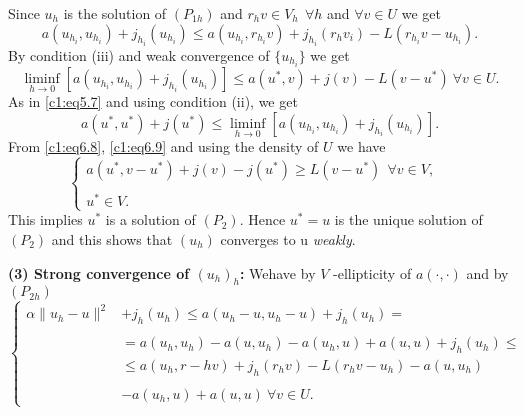 Since $u_h$ is the solution of $(P_{1h})$ and $r_h v \in V_h ~~
\forall h$ and $\forall v \in U$ we get  
\begin{equation}
a(u_{h_{i}}, u_{h_{i}})+j_{h_{i}} (u_{h_{i}}) \leq a(u_{h_{i}},
r_{h_{i}} v) + j_{h_{i}}(r_h v_i) -L(r_{h_{i}} v-u_{h_{i}}). 
\tag{6.7}\label{c1:eq6.7} 
\end{equation}
By condition (iii) and weak convergence of $\{u_{h_{i}}\}$ we get  
\begin{equation}
\mathop{\lim\inf}_{h \to 0}
[a(u_{h_{i}},u_{h_{i}})+j_{h_{i}}(u_{h_{i}})] \leq a(u^*, v)
+j(v)-L(v-u^*) ~ \forall v \in U. \tag{6.8}\label{c1:eq6.8}  
\end{equation}
As in \eqref{c1:eq5.7} and using condition (ii), we get
\begin{equation}
a(u^*, u^*) +j(u^*) \leq \mathop{\lim\inf}_{h \to 0}
[a(u_{h_{i}},u_{h_{i}})+j_{h_{i}}(u_{h_{i}})]. \tag{6.9}\label{c1:eq6.9} 
\end{equation}
From \eqref{c1:eq6.8}, \eqref{c1:eq6.9} and using the density of $U$
we have  
\begin{equation*}
\begin{cases}
a(u^*, v - u^*) + j(v) - j(u^*) \geq L(v - u^*) ~~\forall v \in V,\\
&\\
u^* \in V.
\end{cases}
\end{equation*}
This implies $u^*$ is a solution of $(P_2)$. Hence $u^* = u$ is the
unique solution of $(P_2)$ and this shows that $(u_h)$ converges to u
\textit{weakly}. 

\medskip
\textbf{(3) Strong convergence of $(u_h)_h$:} We\pageoriginale have by $V$
-ellipticity of $a(\cdot , \cdot)$ and by $(P_{2h})$ 
\begin{equation}
\begin{cases}
\alpha \parallel u_h -u \parallel^2 & +j_h(u_h) \leq a(u_h -u,
u_h-u)+j_h(u_h)=\\ 
&\\
& = a(u_h,u_h)-a(u,u_h)-a(u_h,u)+a(u,u)+j_h(u_h) \leq \\
& \leq a(u_h,r-h v)+j_h(r_hv) -L(r_hv-u_h)-a(u,u_h)\\
&\\
& -a(u_h,u)+a(u,u) ~\forall v \in U.
\end{cases}\tag{6.10}\label{c1:eq6.10}
\end{equation}

